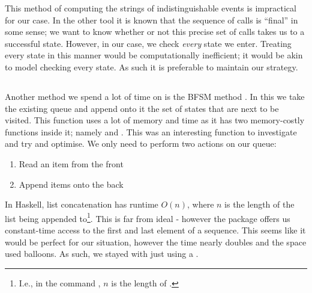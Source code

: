 \documentclass[10pt, a4paper]{report}
\begin{document}

This method of computing the strings of indistinguishable events is impractical
for our case. In the other tool it is known that the sequence of calls is
``final'' in some sense; we want to know whether or not this precise set of
calls takes us to a successful state. However, in our case, we check
\emph{every} state we enter. Treating every state in this manner would be
computationally inefficient; it would be akin to model checking every state. As
such it is preferable to maintain our strategy.  


\subsection{}

Another method we spend a lot of time on is the BFSM method . In
this we take the existing queue and append onto it the set of states that are
next to be visited. This function uses a lot of memory and time as it has two
memory-costly functions inside it; namely  and \mih{(++)}.
This was an interesting function to investigate and try and optimise. We only
need to perform two actions on our queue:

\begin{enumerate}
\item Read an item from the front
\item Append items onto the back
\end{enumerate}

In Haskell, list concatenation has runtime $O(n)$, where $n$ is the length of
the list being appended to\footnote{I.e., in the command , $n$ is
  the length of .}. This is far from ideal - however the 
package offers us constant-time access to the first and last element of a
sequence. This seems like it would be perfect for our situation, however the
time nearly doubles and the space used balloons. As such, we stayed with just
using a .
\end{document}
